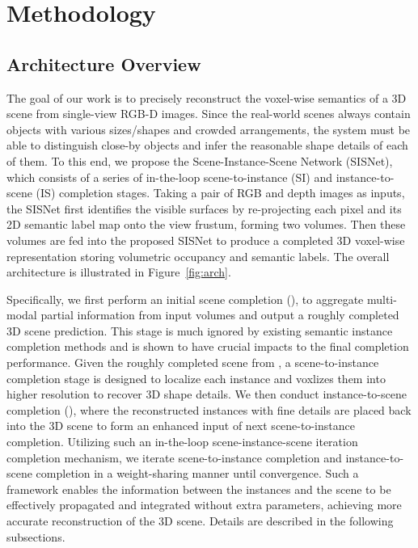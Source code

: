 \documentclass[final]{cvpr}
\begin{document}
\section{Methodology}
\vspace{-0.2cm}
\subsection{Architecture Overview}
\vspace{-0.1cm}
The goal of our work is to precisely reconstruct the voxel-wise semantics of a 3D scene from single-view RGB-D images. Since the real-world scenes always contain objects with various sizes/shapes and crowded arrangements, the system must be able to distinguish close-by objects and infer the reasonable shape details of each of them. To this end, we propose the Scene-Instance-Scene Network (SISNet), which consists of a series of in-the-loop scene-to-instance (SI) and instance-to-scene (IS) completion stages. Taking a pair of RGB and depth images as inputs, the SISNet first identifies the visible surfaces by re-projecting each pixel and its 2D semantic label map onto the view frustum, forming two volumes. Then these volumes are fed into the proposed SISNet to produce a completed 3D voxel-wise representation storing volumetric occupancy and semantic labels. The overall architecture is illustrated in Figure~\ref{fig:arch}.




Specifically, we first perform an initial scene completion (), to aggregate multi-modal partial information from input volumes and output a roughly completed 3D scene prediction. 
This stage is much ignored by existing semantic instance completion methods and is shown to have crucial impacts to the final completion performance.
Given the roughly completed scene from , a scene-to-instance completion stage  is designed to localize each instance and voxlizes them into higher resolution to recover 3D shape details. We then conduct instance-to-scene completion (), where the reconstructed instances with fine details are placed back into the 3D scene to form an enhanced input of next scene-to-instance completion. Utilizing such an in-the-loop scene-instance-scene iteration completion mechanism, we iterate scene-to-instance completion  and instance-to-scene completion  in a weight-sharing manner until convergence. Such a framework enables the information between the instances and the scene to be effectively propagated and integrated without extra parameters, achieving more accurate reconstruction of the 3D scene. Details are described in the following subsections.
\end{document}
